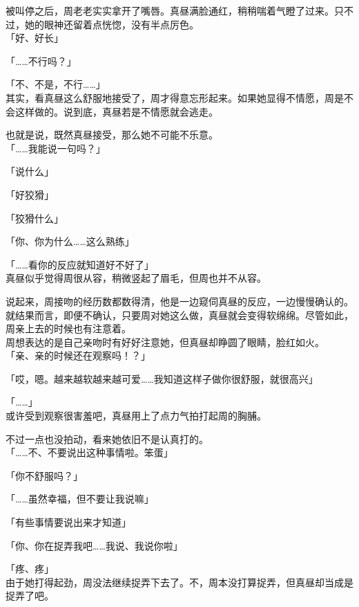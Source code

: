 被叫停之后，周老老实实拿开了嘴唇。真昼满脸通红，稍稍喘着气瞪了过来。只不过，她的眼神还留着点恍惚，没有半点厉色。\\

「好、好长」

「……不行吗？」

「不、不是，不行……」\\

其实，看真昼这么舒服地接受了，周才得意忘形起来。如果她显得不情愿，周是不会这样做的。说到底，真昼若是不情愿就会逃走。

也就是说，既然真昼接受，那么她不可能不乐意。\\

「……我能说一句吗？」

「说什么」

「好狡猾」

「狡猾什么」

「你、你为什么……这么熟练」

「……看你的反应就知道好不好了」\\

真昼似乎觉得周很从容，稍微竖起了眉毛，但周也并不从容。

说起来，周接吻的经历数都数得清，他是一边窥伺真昼的反应，一边慢慢确认的。就结果而言，即便不确认，只要周对她这么做，真昼就会变得软绵绵。尽管如此，周亲上去的时候也有注意着。\\

周想表达的是自己亲吻时有好好注意她，但真昼却睁圆了眼睛，脸红如火。\\

「亲、亲的时候还在观察吗！？」

「哎，嗯。越来越软越来越可爱……我知道这样子做你很舒服，就很高兴」

「……」\\

或许受到观察很害羞吧，真昼用上了点力气拍打起周的胸脯。

不过一点也没拍动，看来她依旧不是认真打的。\\

「……不、不要说出这种事情啦。笨蛋」

「你不舒服吗？」

「……虽然幸福，但不要让我说嘛」

「有些事情要说出来才知道」

「你、你在捉弄我吧……我说、我说你啦」

「疼、疼」\\

由于她打得起劲，周没法继续捉弄下去了。不，周本没打算捉弄，但真昼却当成是捉弄了吧。\\

